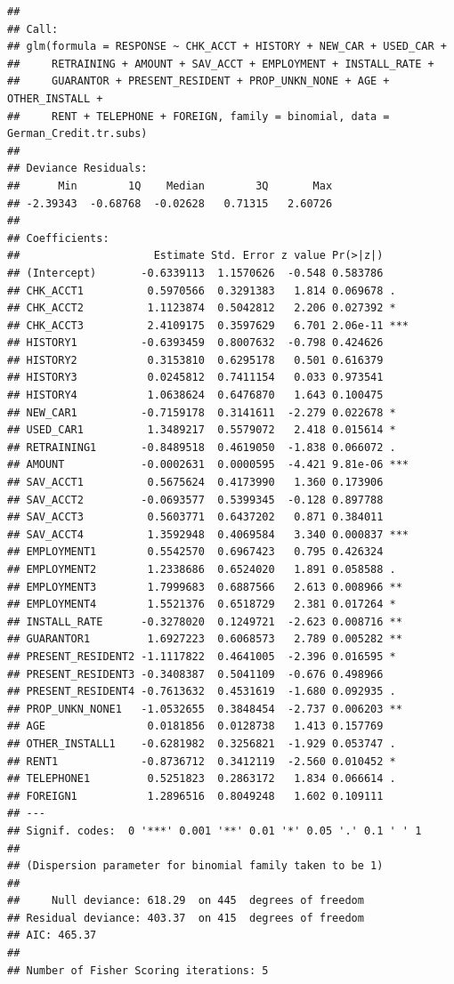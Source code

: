 \documentclass[
]{article}
\begin{document}
\begin{verbatim}
## 
## Call:
## glm(formula = RESPONSE ~ CHK_ACCT + HISTORY + NEW_CAR + USED_CAR + 
##     RETRAINING + AMOUNT + SAV_ACCT + EMPLOYMENT + INSTALL_RATE + 
##     GUARANTOR + PRESENT_RESIDENT + PROP_UNKN_NONE + AGE + OTHER_INSTALL + 
##     RENT + TELEPHONE + FOREIGN, family = binomial, data = German_Credit.tr.subs)
## 
## Deviance Residuals: 
##      Min        1Q    Median        3Q       Max  
## -2.39343  -0.68768  -0.02628   0.71315   2.60726  
## 
## Coefficients:
##                     Estimate Std. Error z value Pr(>|z|)    
## (Intercept)       -0.6339113  1.1570626  -0.548 0.583786    
## CHK_ACCT1          0.5970566  0.3291383   1.814 0.069678 .  
## CHK_ACCT2          1.1123874  0.5042812   2.206 0.027392 *  
## CHK_ACCT3          2.4109175  0.3597629   6.701 2.06e-11 ***
## HISTORY1          -0.6393459  0.8007632  -0.798 0.424626    
## HISTORY2           0.3153810  0.6295178   0.501 0.616379    
## HISTORY3           0.0245812  0.7411154   0.033 0.973541    
## HISTORY4           1.0638624  0.6476870   1.643 0.100475    
## NEW_CAR1          -0.7159178  0.3141611  -2.279 0.022678 *  
## USED_CAR1          1.3489217  0.5579072   2.418 0.015614 *  
## RETRAINING1       -0.8489518  0.4619050  -1.838 0.066072 .  
## AMOUNT            -0.0002631  0.0000595  -4.421 9.81e-06 ***
## SAV_ACCT1          0.5675624  0.4173990   1.360 0.173906    
## SAV_ACCT2         -0.0693577  0.5399345  -0.128 0.897788    
## SAV_ACCT3          0.5603771  0.6437202   0.871 0.384011    
## SAV_ACCT4          1.3592948  0.4069584   3.340 0.000837 ***
## EMPLOYMENT1        0.5542570  0.6967423   0.795 0.426324    
## EMPLOYMENT2        1.2338686  0.6524020   1.891 0.058588 .  
## EMPLOYMENT3        1.7999683  0.6887566   2.613 0.008966 ** 
## EMPLOYMENT4        1.5521376  0.6518729   2.381 0.017264 *  
## INSTALL_RATE      -0.3278020  0.1249721  -2.623 0.008716 ** 
## GUARANTOR1         1.6927223  0.6068573   2.789 0.005282 ** 
## PRESENT_RESIDENT2 -1.1117822  0.4641005  -2.396 0.016595 *  
## PRESENT_RESIDENT3 -0.3408387  0.5041109  -0.676 0.498966    
## PRESENT_RESIDENT4 -0.7613632  0.4531619  -1.680 0.092935 .  
## PROP_UNKN_NONE1   -1.0532655  0.3848454  -2.737 0.006203 ** 
## AGE                0.0181856  0.0128738   1.413 0.157769    
## OTHER_INSTALL1    -0.6281982  0.3256821  -1.929 0.053747 .  
## RENT1             -0.8736712  0.3412119  -2.560 0.010452 *  
## TELEPHONE1         0.5251823  0.2863172   1.834 0.066614 .  
## FOREIGN1           1.2896516  0.8049248   1.602 0.109111    
## ---
## Signif. codes:  0 '***' 0.001 '**' 0.01 '*' 0.05 '.' 0.1 ' ' 1
## 
## (Dispersion parameter for binomial family taken to be 1)
## 
##     Null deviance: 618.29  on 445  degrees of freedom
## Residual deviance: 403.37  on 415  degrees of freedom
## AIC: 465.37
## 
## Number of Fisher Scoring iterations: 5
\end{verbatim}
\end{document}
